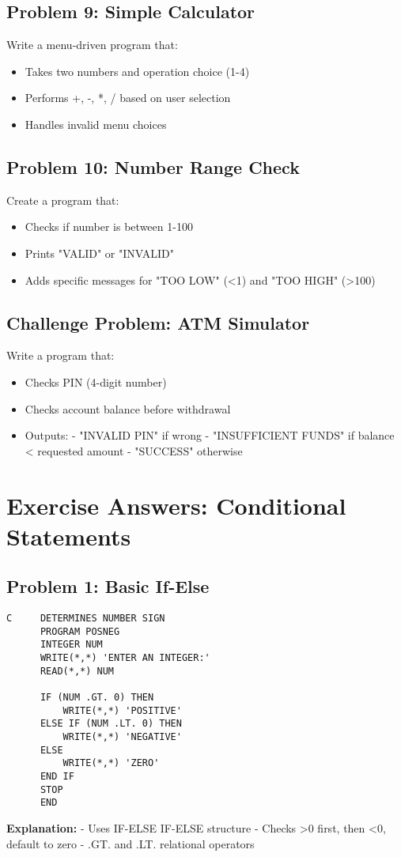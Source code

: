 \documentclass{book}
\begin{document}
\subsection*{Problem 9: Simple Calculator}  
Write a menu-driven program that:  
\begin{itemize}  
\item Takes two numbers and operation choice (1-4)  
\item Performs +, -, *, / based on user selection  
\item Handles invalid menu choices  
\end{itemize}

\subsection*{Problem 10: Number Range Check}  
Create a program that:  
\begin{itemize}  
\item Checks if number is between 1-100  
\item Prints "VALID" or "INVALID"  
\item Adds specific messages for "TOO LOW" (<1) and "TOO HIGH" (>100)  
\end{itemize}

\subsection*{Challenge Problem: ATM Simulator}  
Write a program that:  
\begin{itemize}  
\item Checks PIN (4-digit number)  
\item Checks account balance before withdrawal  
\item Outputs:  
  - "INVALID PIN" if wrong  
  - "INSUFFICIENT FUNDS" if balance < requested amount  
  - "SUCCESS" otherwise  
\end{itemize}

\section{Exercise Answers: Conditional Statements}

\subsection*{Problem 1: Basic If-Else}
\begin{verbatim}
C     DETERMINES NUMBER SIGN
      PROGRAM POSNEG
      INTEGER NUM
      WRITE(*,*) 'ENTER AN INTEGER:'
      READ(*,*) NUM
      
      IF (NUM .GT. 0) THEN
          WRITE(*,*) 'POSITIVE'
      ELSE IF (NUM .LT. 0) THEN
          WRITE(*,*) 'NEGATIVE'
      ELSE
          WRITE(*,*) 'ZERO'
      END IF
      STOP
      END
\end{verbatim}
\textbf{Explanation:}
- Uses IF-ELSE IF-ELSE structure
- Checks >0 first, then <0, default to zero
- .GT. and .LT. relational operators
\end{document}
